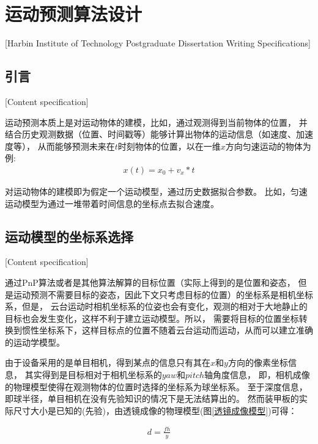 

\chapter[运动预测算法设计]{运动预测算法设计}[Harbin Institute of Technology Postgraduate Dissertation Writing Specifications]


\section{引言}[Content specification]

运动预测本质上是对运动物体的建模，比如，通过观测得到当前物体的位置，
并结合历史观测数据（位置、时间戳等）能够计算出物体的运动信息（如速度、加速度等），
从而能够预测未来在$t$时刻物体的位置，以在一维$x$方向匀速运动的物体为例: 
\begin{gather}
    x(t) = x_0 + v_x*t
\end{gather}

对运动物体的建模即为假定一个运动模型，通过历史数据拟合参数。
比如，匀速运动模型为通过一堆带着时间信息的坐标点去拟合速度。




\section{运动模型的坐标系选择}[Content specification]

通过PnP\cite{wu2006pnp}算法或者是其他算法解算的目标位置（实际上得到的是位置和姿态，
但是运动预测不需要目标的姿态，因此下文只考虑目标的位置）的坐标系是相机坐标系，但是，
云台运动时相机坐标系的位姿也会有变化，观测的相对于大地静止的目标也会发生变化，这样不利于建立运动模型。所以，
需要将目标的位置坐标转换到惯性坐标系下，这样目标点的位置不随着云台运动而运动，从而可以建立准确的运动学模型。\par
由于设备采用的是单目相机，得到某点的信息只有其在$x$和$y$方向的像素坐标信息，
其实得到是目标相对于相机坐标系的$yaw$和$pitch$轴角度信息，
即，相机成像的物理模型使得在观测物体的位置时选择的坐标系为球坐标系。
至于深度信息，即球半径，单目相机在没有先验知识的情况下是无法结算出的。
然而装甲板的实际尺寸大小是已知的(先验)，由透镜成像的物理模型(图\ref{透镜成像模型})可得：\par
\begin{gather}
    d = \frac{fh}{y} 
\end{gather}

